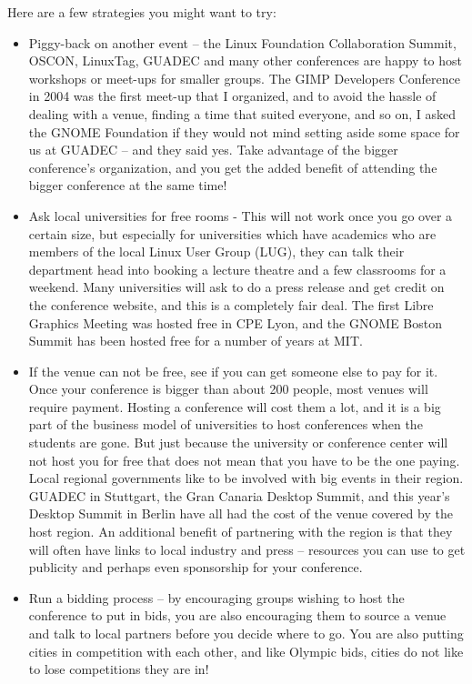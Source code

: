 Here are a few strategies you might want to try:
\begin{itemize}
 \item Piggy-back on another event -- the Linux Foundation Collaboration
Summit, OSCON, LinuxTag, GUADEC and many other conferences are happy to
host workshops or meet-ups for smaller groups. The GIMP Developers
Conference in 2004 was the first meet-up that I organized, and to avoid
the hassle of dealing with a venue, finding a time that suited everyone,
and so on, I asked the GNOME Foundation if they would not mind setting
aside some space for us at GUADEC -- and they said yes.
Take advantage of the bigger conference's organization, and you get the
added benefit of attending the bigger conference at the same time!
 \item Ask local universities for free rooms - This will not work once you go
over a certain size, but especially for universities which have
academics who are members of the local Linux User Group (LUG), they can talk
their department head into booking a lecture theatre and a few classrooms for a
weekend. Many universities will ask to do a press release and get credit
on the conference website, and this is a completely fair deal.
The first Libre Graphics Meeting was hosted free in CPE Lyon, and the
GNOME Boston Summit has been hosted free for a number of years at MIT.
 \item If the venue can not be free, see if you can get someone else to pay
for it. Once your conference is bigger than about 200 people, most
venues will require payment. Hosting a conference will cost them a lot,
and it is a big part of the business model of universities to host
conferences when the students are gone. But just because the university
or conference center will not host you for free that does not mean that you have
to be the one paying. Local regional governments like to be involved with big
events in their region. GUADEC in Stuttgart, the Gran Canaria Desktop Summit, and this year's Desktop Summit in Berlin have all had the cost of the venue
covered by the host region. An additional benefit of partnering with the
region is that they will often have links to local industry and press --
resources you can use to get publicity and perhaps even sponsorship for
your conference.
 \item Run a bidding process -- by encouraging groups wishing to host the
conference to put in bids, you are also encouraging them to source a
venue and talk to local partners before you decide where to go. You are
also putting cities in competition with each other, and like Olympic
bids, cities do not like to lose competitions they are in!
\end{itemize}

